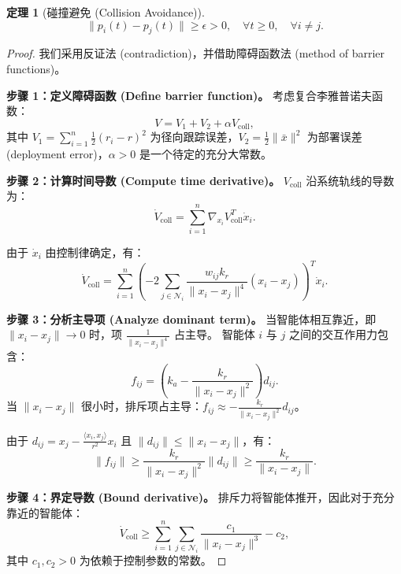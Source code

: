 \documentclass{ctexart}
\newtheorem{theorem}{定理}[section]
\begin{document}
\begin{theorem}[碰撞避免 (Collision Avoidance)]
\begin{equation}
\|p_i(t) - p_j(t)\| \geq \epsilon > 0, \quad \forall t \geq 0, \quad \forall i \neq j.
\end{equation}
\end{theorem}

\begin{proof}
我们采用反证法 (contradiction)，并借助障碍函数法 (method of barrier functions)。

\textbf{步骤 1：定义障碍函数 (Define barrier function)。}
考虑复合李雅普诺夫函数：
\begin{equation}
V = V_1 + V_2 + \alpha V_{\text{coll}},
\end{equation}
其中 $V_1 = \sum_{i=1}^{n} \frac{1}{2}(r_i - r)^2$ 为径向跟踪误差，$V_2 = \frac{1}{2} \|\bar{x}\|^2$ 为部署误差 (deployment error)，$\alpha > 0$ 是一个待定的充分大常数。

\textbf{步骤 2：计算时间导数 (Compute time derivative)。}
$V_{\text{coll}}$ 沿系统轨线的导数为：
\begin{equation}
\dot{V}_{\text{coll}} = \sum_{i=1}^{n} \nabla_{x_i} V_{\text{coll}}^T \dot{x}_i.
\end{equation}

由于 $\dot{x}_i$ 由控制律确定，有：
\begin{equation}
\dot{V}_{\text{coll}} = \sum_{i=1}^{n} \left( -2 \sum_{j \in \mathcal{N}_i} \frac{w_{ij} k_r}{\|x_i - x_j\|^4} (x_i - x_j) \right)^T \dot{x}_i.
\end{equation}

\textbf{步骤 3：分析主导项 (Analyze dominant term)。}
当智能体相互靠近，即 $\|x_i - x_j\| \to 0$ 时，项 $\frac{1}{\|x_i - x_j\|^4}$ 占主导。
智能体 $i$ 与 $j$ 之间的交互作用力包含：
\begin{equation}
f_{ij} = \left(k_a - \frac{k_r}{\|x_i - x_j\|^2}\right) d_{ij}.
\end{equation}
当 $\|x_i - x_j\|$ 很小时，排斥项占主导：$f_{ij} \approx -\frac{k_r}{\|x_i - x_j\|^2} d_{ij}$。

由于 $d_{ij} = x_j - \frac{\langle x_i, x_j \rangle}{r^2} x_i$ 且 $\|d_{ij}\| \leq \|x_i - x_j\|$，有：
\begin{equation}
\|f_{ij}\| \geq \frac{k_r}{\|x_i - x_j\|^2} \|d_{ij}\| \geq \frac{k_r}{\|x_i - x_j\|}.
\end{equation}

\textbf{步骤 4：界定导数 (Bound derivative)。}
排斥力将智能体推开，因此对于充分靠近的智能体：
\begin{equation}
\dot{V}_{\text{coll}} \geq \sum_{i=1}^{n} \sum_{j \in \mathcal{N}_i} \frac{c_1}{\|x_i - x_j\|^3} - c_2,
\end{equation}
其中 $c_1, c_2 > 0$ 为依赖于控制参数的常数。


\end{proof}
\end{document}

